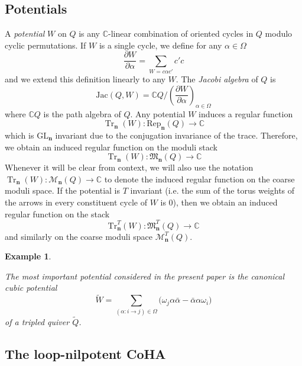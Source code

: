 \documentclass{amsart}
\newtheorem{example}[theorem]{Example}
\def\GL{\mathrm{GL}}
\def\BC{{\mathbb{C}}}
\DeclareMathOperator{\Tr}{\mathrm{Tr}}
\def\bn{{\boldsymbol{n}}}
\def\edge{\Omega}
\def\dalpha{\bar{\alpha}}
\def\tQ{\tilde{Q}}
\def\tW{\tilde{W}}
\begin{document}
\medskip 

\subsection{Potentials} 
\label{sub:potential}

A \emph{potential} $W$ on $Q$ is any
$\BC$-linear combination of oriented cycles in $Q$ modulo cyclic permutations. If $W$ is a single cycle, we define for any $\alpha \in \edge$
\[ \frac{\partial W}{\partial \alpha} = \sum_{W = c\alpha c'} c'c \] 
and we extend this definition linearly to any $W$. The \emph{Jacobi algebra} of $Q$ is
$$
\text{Jac}(Q,W) = \BC Q \Big / \left( \frac{\partial W}{\partial \alpha} \right)_{\alpha \in \edge}
$$
where $\BC Q$ is the path algebra of $Q$.
Any potential $W$ induces a regular function 
\[ \Tr_{\bn}(W): \mathrm{Rep}_{\bn}(Q) \rightarrow \BC 
\] 
which is $\GL_{\bn}$ invariant due to the conjugation invariance of the trace. Therefore, we obtain an induced regular function on the moduli stack 
\[ \Tr_{\bn}(W): \mathfrak{M}_{\bn}(Q) \rightarrow \BC 
\] 
Whenever it will be clear from context, we will also use the notation $\Tr_{\bn}(W): \mathcal{M}_{\bn}(Q) \rightarrow \BC$ to denote the induced regular function on the coarse moduli space. If the potential is $T$ invariant (i.e. the sum of the torus weights of the arrows in every constituent cycle of $W$ is 0), then we obtain an induced regular function on the stack
$$
\mathrm{Tr}^T_{\bn}(W): \mathfrak{M}^T_{\bn}(Q) \rightarrow \mathbb{C}
$$ 
and similarly on the coarse moduli space $\mathcal{M}^{T}_{\bn}(Q)$.

\medskip

\begin{example}
\label{ex:cubic}

The most important potential considered in the present paper is the canonical cubic potential
\begin{equation}
\label{eqn:potential}
\tW = \sum_{(\alpha : i \rightarrow j) \in \edge} \Big( \omega_j \alpha \dalpha - \dalpha \alpha \omega_i \Big)
\end{equation}
of a tripled quiver $\tQ$.

\end{example}

\medskip 

\subsection{The loop-nilpotent CoHA}
\label{sub:coha} 
\end{document}
